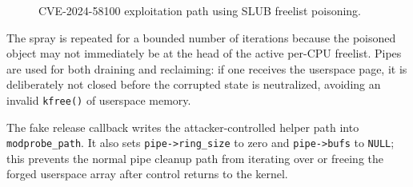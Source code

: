 \documentclass[../main.tex]{subfiles}
\begin{document}
\begin{figure}[H]
\centering
{}
\caption{CVE-2024-58100 exploitation path using SLUB freelist poisoning.}
\label{fig:path-2024-58100}
\end{figure}

The spray is repeated for a bounded number of iterations because the poisoned object may not immediately be at the head of the active per-CPU freelist. Pipes are used for both draining and reclaiming: if one receives the userspace page, it is deliberately not closed before the corrupted state is neutralized, avoiding an invalid \texttt{kfree()} of userspace memory.

The fake release callback writes the attacker-controlled helper path into \texttt{modprobe\_path}. It also sets \texttt{pipe->ring\_size} to zero and \texttt{pipe->bufs} to \texttt{NULL}; this prevents the normal pipe cleanup path from iterating over or freeing the forged userspace array after control returns to the kernel.
\end{document}
